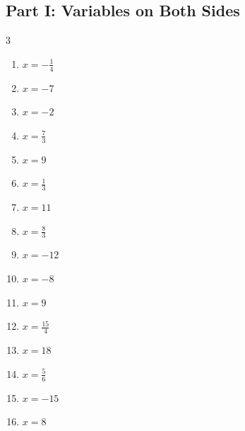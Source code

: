 \documentclass[11pt]{article}
\begin{document}
\subsection*{Part I: Variables on Both Sides}
\begin{multicols}{3}
\begin{enumerate}
  \item $x = - \frac{1}{4}$
  \item $x = -7$
  \item $x = -2$
  \item $x = \frac{7}{3}$
  \item $x = 9$
  \item $x = \frac{1}{3}$
  \item $x = 11$
  \item $x = \frac{8}{3}$
  \item $x = -12$
  \item $x = -8$
  \item $x = 9$
  \item $x = \frac{15}{4}$
  \item $x = 18$
  \item $x = \frac{5}{6}$
  \item $x = -15$
  \item $x = 8$
\end{enumerate}
\end{multicols}
\end{document}
